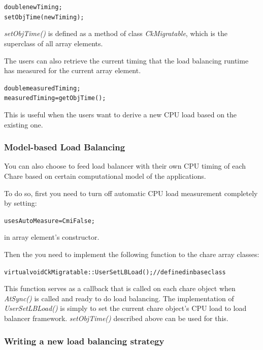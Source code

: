 \begin{alltt}
   double newTiming;
   setObjTime(newTiming);
\end{alltt}

{\em setObjTime()} is defined as a method of class {\em CkMigratable}, which is
the superclass of all array elements.

The users can also retrieve the current timing that the load balancing runtime
has measured for the current array element. 
 
\begin{alltt} 
   double measuredTiming; 
   measuredTiming = getObjTime(); 
\end{alltt}

This is useful when the users want to derive a new CPU load based on the 
existing one.

\subsubsection{Model-based Load Balancing}

You can also choose to feed load balancer with their own CPU
timing of each Chare based on certain computational model of the applications.

To do so, first you need to turn off automatic CPU load measurement completely
by setting:

\begin{alltt}
   usesAutoMeasure = CmiFalse;
\end{alltt}

in array element's constructor.

Then the you need to implement the following function to the chare array
classes:

\begin{alltt}
   virtual void CkMigratable::UserSetLBLoad();      // defined in base class
\end{alltt}

This function serves as a callback that is called on each chare object when
{\em AtSync()} is called and ready to do load balancing. The implementation of
{\em UserSetLBLoad()} is simply to set the current chare object's CPU load to
load balancer framework. {\em setObjTime()} described above can be used for
this.

\subsubsection{Writing a new load balancing strategy}

